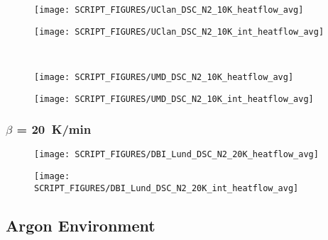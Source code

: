 \vfill
\newpage
\noindent
\begin{minipage}{0.5\textwidth}
\begin{figure}[H]
{\texttt{[image: SCRIPT\_FIGURES/UClan\_DSC\_N2\_10K\_heatflow\_avg]}}\\
\end{figure}
\end{minipage}
\begin{minipage}{0.35\textwidth}
\begin{figure}[H]
{\texttt{[image: SCRIPT\_FIGURES/UClan\_DSC\_N2\_10K\_int\_heatflow\_avg]}}\\
\end{figure}
\end{minipage}\\
\begin{minipage}{0.5\textwidth}
\begin{figure}[H]
{\texttt{[image: SCRIPT\_FIGURES/UMD\_DSC\_N2\_10K\_heatflow\_avg]}}\\
\end{figure}
\end{minipage}
\begin{minipage}{0.35\textwidth}
\begin{figure}[H]
{\texttt{[image: SCRIPT\_FIGURES/UMD\_DSC\_N2\_10K\_int\_heatflow\_avg]}}\\
\end{figure}
\end{minipage}
\vfill
\subsubsection{$\beta$ = 20~K/min}
\begin{minipage}{0.5\textwidth}
\begin{figure}[H]
{\texttt{[image: SCRIPT\_FIGURES/DBI\_Lund\_DSC\_N2\_20K\_heatflow\_avg]}}\\
\end{figure}
\end{minipage} 
\begin{minipage}{0.35\textwidth}
\begin{figure}[H]
{\texttt{[image: SCRIPT\_FIGURES/DBI\_Lund\_DSC\_N2\_20K\_int\_heatflow\_avg]}}\\
\end{figure}
\end{minipage}
\vfill

\newpage
\subsection{Argon Environment}
\label{DSC_Ar}
